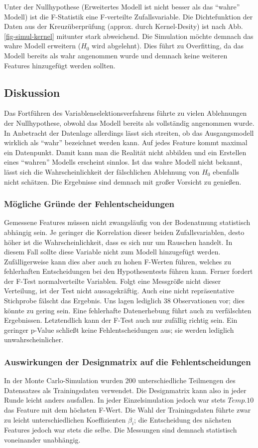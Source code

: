 Unter der Nullhypothese (Erweitertes Modell ist nicht besser als das "`wahre"' Modell) ist die F-Statistik eine F-verteilte Zufallsvariable.
Die Dichtefunktion der Daten aus der Kreuzüberprüfung (approx. durch Kernel-Desity) ist nach Abb. \ref{fig-simul-kernel} mitunter stark abweichend.
Die Simulation möchte demnach das wahre Modell erweitern ($H_0$ wird abgelehnt).
Dies führt zu Overfitting, da das Modell bereits als wahr angenommen wurde und demnach keine weiteren Features hinzugefügt werden sollten.

\subsection{Diskussion}
Das Fortführen des Variablenselektionsverfahrens führte zu vielen Ablehnungen der Nullhypothese, obwohl das Modell bereits als vollständig angenommen wurde.
In Anbetracht der Datenlage allerdings lässt sich streiten, ob das Ausgangsmodell wirklich als "`wahr"' bezeichnet werden kann.
Auf jedes Feature kommt maximal ein Datenpunkt.
Damit kann man die Realität nicht abbilden und ein Erstellen eines "`wahren"' Modells erscheint sinnlos.
Ist das wahre Modell nicht bekannt, lässt sich die Wahrscheinlichkeit der fälschlichen Ablehnung von $H_0$ ebenfalls nicht schätzen.
Die Ergebnisse sind demnach mit großer Vorsicht zu genießen.

\subsubsection{Mögliche Gründe der Fehlentscheidungen}
Gemessene Features müssen nicht zwangsläufig von der Bodenatmung statistisch abhängig sein.
Je geringer die Korrelation dieser beiden Zufallsvariablen, desto höher ist die Wahrscheinlichkeit, dass es sich nur um Rauschen handelt.
In diesem Fall sollte diese Variable nicht zum Modell hinzugefügt werden.
Zufälligerweise kann dies aber auch zu hohen F-Werten führen, welches zu fehlerhaften Entscheidungen bei den Hypothesentests führen kann.
Ferner fordert der F-Test normalverteilte Variablen.
Folgt eine Messgröße nicht dieser Verteilung, ist der Test nicht aussagekräftig.
Auch eine nicht repräsentative Stichprobe fälscht das Ergebnis.
Uns lagen lediglich 38 Observationen vor; dies könnte zu gering sein.
Eine fehlerhafte Datenerhebung führt auch zu verfälschten Ergebnissen.
Letztendlich kann der F-Test auch nur zufällig richtig sein.
Ein geringer p-Value schließt keine Fehlentscheidungen aus; sie werden lediglich unwahrscheinlicher.

\subsubsection{Auswirkungen der Designmatrix auf die Fehlentscheidungen}
In der Monte Carlo-Simulation wurden 200 unterschiedliche Teilmengen des Datensatzes als Trainingsdaten verwendet.
Die Designmatrix kann also in jeder Runde leicht anders ausfallen.
In jeder Einzelsimulation jedoch war stets $Temp.10$ das Feature mit dem höchsten F-Wert.
Die Wahl der Trainingsdaten führte zwar zu leicht unterschiedlichen Koeffizienten $\beta_i$; die Entscheidung des nächsten Features jedoch war stets die selbe.
Die Messungen sind demnach statistisch voneinander unabhängig.


